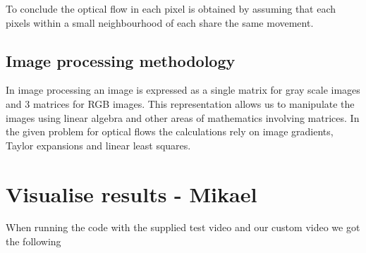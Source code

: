 \documentclass{article}
\begin{document}
To conclude the optical flow in each pixel is obtained by assuming that each pixels within a small neighbourhood of each share the same movement. 

\subsection{Image processing methodology}
In image processing an image is expressed as a single matrix for gray scale images and 3 matrices for RGB images. This representation allows us to manipulate the images using linear algebra and other areas of mathematics involving matrices. In the given problem for optical flows the calculations rely on image gradients, Taylor expansions and linear least squares. 

\section{Visualise results - Mikael}
When running the code with the supplied test video and our custom video we got the following
\end{document}
